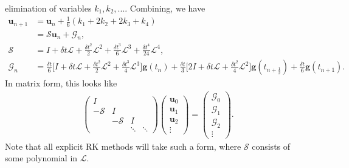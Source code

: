 \documentclass[a4paper,12pt]{article}
\begin{document}
elimination of variables $k_1,k_2,...$. Combining, we have 
%
\begin{align*}
\mathbf{u}_{n+1} & = \mathbf{u}_n + \tfrac{1}{6}(k_1+2k_2+2k_3+k_4) \\
	& = \mathcal{S}\mathbf{u}_n + \mathcal{G}_n, \\
\mathcal{S} & = I + \delta t\mathcal{L} + \tfrac{\delta t^2}{2}\mathcal{L}^2 + \tfrac{\delta t^3}{6}\mathcal{L}^3 +
	\tfrac{\delta t^4}{24}\mathcal{L}^4, \\
\mathcal{G}_n & = \tfrac{\delta t}{6}\Big[ I  +\delta t \mathcal{L} + \tfrac{\delta t^2}{2}\mathcal{L}^2 + \tfrac{\delta t^3}{4}\mathcal{L}^3\Big] \mathbf{g}(t_{n}) +
	\tfrac{\delta t}{3}\Big[2I + \delta t \mathcal{L} + \tfrac{\delta t^2}{4}\mathcal{L}^2\Big]\mathbf{g}(t_{n+\frac{1}{2}}) + \tfrac{\delta t}{6} \mathbf{g}(t_{n+1}).
\end{align*}
%
In matrix form, this looks like
%
\begin{align} \label{eq:condensed}
\begin{pmatrix} 
I \\ -\mathcal{S} & I \\ & -\mathcal{S} & I \\ && \ddots & \ddots \end{pmatrix}
	\begin{pmatrix} \mathbf{u}_0 \\ \mathbf{u}_1 \\\mathbf{u}_2 \\ \vdots \end{pmatrix}
= \begin{pmatrix} \mathcal{G}_0 \\ \mathcal{G}_1 \\ \mathcal{G}_2 \\ \vdots \end{pmatrix}.
\end{align}
%
Note that all explicit RK methods will take such a form, where $\mathcal{S}$ consists of some polynomial in $\mathcal{L}$.
\end{document}
